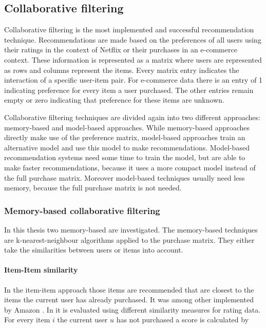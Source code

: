 \documentclass[10pt]{reportMaster}
\begin{document}
\subsection{Collaborative filtering}
\label{sec:collaborativeFiltering}
\label{rs_cf}

Collaborative filtering is the most implemented and successful recommendation technique.
Recommendations are made based on the preferences of all users using their ratings in the context of Netflix or their purchases in an e-commerce context.
These information is represented as a matrix where users are represented as rows and columns represent the items.
Every matrix entry indicates the interaction of a specific user-item pair.
For e-commerce data there is an entry of 1 indicating preference for every item a user purchased.
The other entries remain empty or zero indicating that preference for these items are unknown. %

Collaborative filtering techniques are divided again into two different approaches: memory-based and model-based approaches.
While memory-based approaches directly make use of the preference matrix, model-based approaches train an alternative model and use this model to make recommendations.
Model-based recommendation systems need some time to train the model, but are able to make faster recommendations, because it uses a more compact model instead of the full purchase matrix.
Moreover model-based techniques usually need less memory, because the full purchase matrix is not needed.

\subsubsection{Memory-based collaborative filtering}
\label{sec:memBasedCF}

In this thesis two memory-based are investigated.
The memory-based techniques are k-nearest-neighbour algorithms applied to the purchase matrix.
They either take the similarities between users or items into account.

\paragraph{Item-Item similarity}
In the item-item approach those items are recommended that are closest to the items the current user has already purchased.
It was among other implemented by Amazon \cite{amazonItemItem}.
In \cite{itemItemAlgorithms} it is evaluated using different similarity measures for rating data. %
For every item $i$ the current user $u$ has not purchased a score is calculated by
\end{document}
